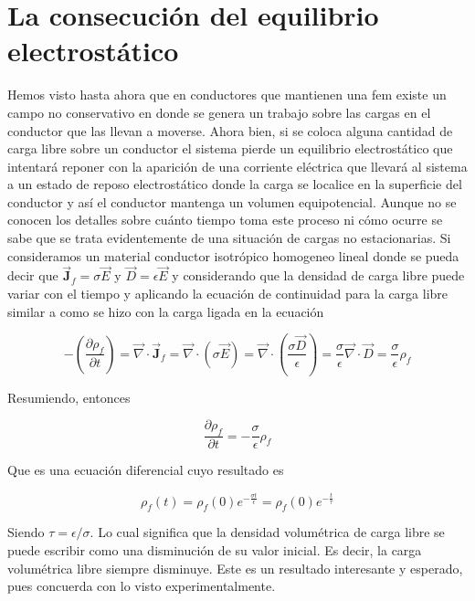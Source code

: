 \section{La consecución del equilibrio electrostático}
Hemos visto hasta ahora que en conductores que mantienen una fem existe un campo no conservativo en donde se genera un trabajo sobre las cargas en el conductor que las llevan a moverse. Ahora bien, si se coloca alguna cantidad de carga libre sobre un conductor el sistema pierde un equilibrio electrostático que intentará reponer con la aparición de una corriente eléctrica que llevará al sistema a un estado de reposo electrostático donde la carga se localice en la superficie del conductor y así el conductor mantenga un volumen equipotencial. Aunque no se conocen los detalles sobre cuánto tiempo toma este proceso ni cómo ocurre se sabe que se trata evidentemente de una situación de cargas no estacionarias. Si consideramos un material conductor isotrópico homogeneo lineal donde se pueda decir que $\vec{\textbf{J}}_f = \sigma \vec{E}$ y $\vec{D} = \epsilon \vec{E}$ y considerando que la densidad de carga libre puede variar con el tiempo y aplicando la ecuación de continuidad para la carga libre similar a como se hizo con la carga ligada en la ecuación 

\begin{equation}
    - \left( \frac{\partial{\rho_f}}{\partial{t}} \right) = \vec{\nabla} \cdot \vec{\textbf{J}}_f = \vec{\nabla} \cdot \left( \sigma \vec{E}\right) = \vec{\nabla} \cdot \left(\frac{\sigma\vec{D}}{\epsilon}\right) = \frac{\sigma}{\epsilon} \vec{\nabla} \cdot \vec{D} = \frac{\sigma}{\epsilon}\rho_f
\end{equation}

Resumiendo, entonces 

\begin{equation}
    \frac{\partial{\rho_f}}{\partial{t}} = - \frac{\sigma}{\epsilon}\rho_f
\end{equation}

Que es una ecuación diferencial cuyo resultado es

\begin{equation}
    \rho_f\left(t\right) = \rho_f\left(0\right)e^{- \frac{\sigma t}{\epsilon}} = \rho_f\left(0\right)e^{- \frac{t}{\tau}}
\end{equation}

Siendo $\tau = \epsilon / \sigma$. Lo cual significa que la densidad volumétrica de carga libre se puede escribir como una disminución de su valor inicial. Es decir, la carga volumétrica libre siempre disminuye. Este es un resultado interesante y esperado, pues concuerda con lo visto experimentalmente.
